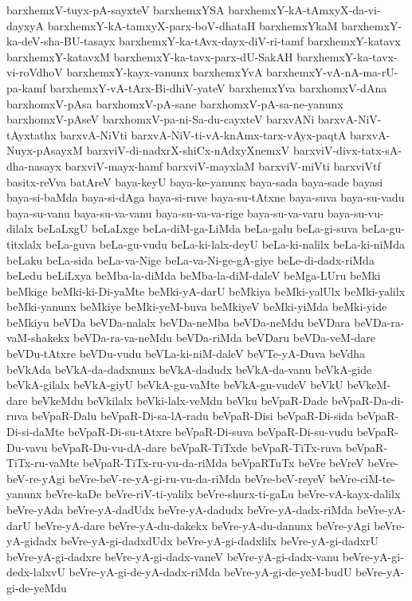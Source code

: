 {barxhemxV-tuyx-pA-sayxteV
barxhemxYSA
barxhemxY-kA-tAmxyX-da-vi-dayxyA
barxhemxY-kA-tamxyX-parx-boV-dhataH
barxhemxYkaM
barxhemxY-ka-deV-sha-BU-tasayx
barxhemxY-ka-tAvx-dayx-diV-ri-tamf
barxhemxY-katavx
barxhemxY-katavxM
barxhemxY-ka-tavx-parx-dU-SakAH
barxhemxY-ka-tavx-vi-roVdhoV
barxhemxY-kayx-vanunx
barxhemxYvA
barxhemxY-vA-nA-ma-rU-pa-kamf
barxhemxY-vA-tArx-Bi-dhiV-yateV
barxhemxYva
barxhomxV-dAna
barxhomxV-pAsa
barxhomxV-pA-sane
barxhomxV-pA-sa-ne-yanunx
barxhomxV-pAseV
barxhomxV-pa-ni-Sa-du-cayxteV
barxvANi
barxvA-NiV-tAyxtathx
barxvA-NiVti
barxvA-NiV-ti-vA-knAmx-tarx-vAyx-paqtA
barxvA-Nuyx-pAsayxM
barxviV-di-nadxrX-shiCx-nAdxyXnemxV
barxviV-divx-tatx-sA-dha-nasayx
barxviV-mayx-hamf
barxviV-mayxlaM
barxviV-miVti
barxviVtf
basitx-reVva
batAreV
baya-keyU
baya-ke-yanunx
baya-sada
baya-sade
bayasi
baya-si-baMda
baya-si-dAga
baya-si-ruve
baya-su-tAtxne
baya-suva
baya-su-vadu
baya-su-vanu
baya-su-va-vanu
baya-su-va-va-rige
baya-su-va-varu
baya-su-vu-dilalx
beLaLxgU
beLaLxge
beLa-diM-ga-LiMda
beLa-galu
beLa-gi-suva
beLa-gu-titxlalx
beLa-guva
beLa-gu-vudu
beLa-ki-lalx-deyU
beLa-ki-nalilx
beLa-ki-niMda
beLaku
beLa-sida
beLa-va-Nige
beLa-va-Ni-ge-gA-giye
beLe-di-dadx-riMda
beLedu
beLiLxya
beMba-la-diMda
beMba-la-diM-daleV
beMga-LUru
beMki
beMkige
beMki-ki-Di-yaMte
beMki-yA-darU
beMkiya
beMki-yalUlx
beMki-yalilx
beMki-yanunx
beMkiye
beMki-yeM-buva
beMkiyeV
beMki-yiMda
beMki-yide
beMkiyu
beVDa
beVDa-nalalx
beVDa-neMba
beVDa-neMdu
beVDara
beVDa-ra-vaM-shakekx
beVDa-ra-va-neMdu
beVDa-riMda
beVDaru
beVDa-veM-dare
beVDu-tAtxre
beVDu-vudu
beVLa-ki-niM-daleV
beVTe-yA-Duva
beVdha
beVkAda
beVkA-da-dadxnunx
beVkA-dadudx
beVkA-da-vanu
beVkA-gide
beVkA-gilalx
beVkA-giyU
beVkA-gu-vaMte
beVkA-gu-vudeV
beVkU
beVkeM-dare
beVkeMdu
beVkilalx
beVki-lalx-veMdu
beVku
beVpaR-Dade
beVpaR-Da-di-ruva
beVpaR-Dalu
beVpaR-Di-sa-lA-radu
beVpaR-Disi
beVpaR-Di-sida
beVpaR-Di-si-daMte
beVpaR-Di-su-tAtxre
beVpaR-Di-suva
beVpaR-Di-su-vudu
beVpaR-Du-vavu
beVpaR-Du-vu-dA-dare
beVpaR-TiTxde
beVpaR-TiTx-ruva
beVpaR-TiTx-ru-vaMte
beVpaR-TiTx-ru-vu-da-riMda
beVpaRTuTx
beVre
beVreV
beVre-beV-re-yAgi
beVre-beV-re-yA-gi-ru-vu-da-riMda
beVre-beV-reyeV
beVre-ciM-te-yanunx
beVre-kaDe
beVre-riV-ti-yalilx
beVre-shurx-ti-gaLu
beVre-vA-kayx-dalilx
beVre-yAda
beVre-yA-dadUdx
beVre-yA-dadudx
beVre-yA-dadx-riMda
beVre-yA-darU
beVre-yA-dare
beVre-yA-du-dakekx
beVre-yA-du-danunx
beVre-yAgi
beVre-yA-gidadx
beVre-yA-gi-dadxdUdx
beVre-yA-gi-dadxlilx
beVre-yA-gi-dadxrU
beVre-yA-gi-dadxre
beVre-yA-gi-dadx-vaneV
beVre-yA-gi-dadx-vanu
beVre-yA-gi-dedx-lalxvU
beVre-yA-gi-de-yA-dadx-riMda
beVre-yA-gi-de-yeM-budU
beVre-yA-gi-de-yeMdu
}
